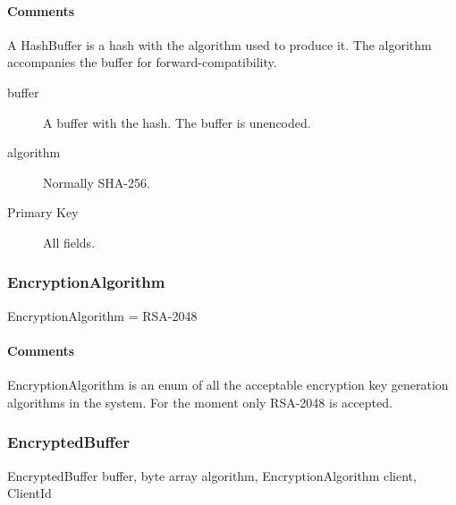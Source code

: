 \documentclass[a4paper,10pt]{article}
\begin{document}
\begin{inparaitem}[ ]
 \item \infrastructure
\end{inparaitem}

\paragraph*{Comments}
A HashBuffer is a hash with the algorithm used to produce it. The algorithm accompanies the buffer for forward-compatibility.

\SpecialItem
\begin{description}
 \item[buffer] A buffer with the hash. The buffer is unencoded.
 \item[algorithm] Normally SHA-256.
\end{description}

\SpecialItem
\begin{description}
 \item[Primary Key] All fields.
\end{description}

\subsubsection{EncryptionAlgorithm}
\begin{verbbox}
EncryptionAlgorithm = { RSA-2048 }
\end{verbbox}
\begin{center}
\theverbbox
\end{center}

\begin{inparaitem}[ ]
 \item \infrastructure
\end{inparaitem}

\paragraph*{Comments}
EncryptionAlgorithm is an enum of all the acceptable encryption key generation algorithms in the system. For the moment only RSA-2048 is accepted.

\subsubsection{EncryptedBuffer}

\begin{verbbox}
EncryptedBuffer
{
  buffer, byte array
  algorithm, EncryptionAlgorithm
  client, ClientId
}
\end{verbbox}
\begin{center}
\theverbbox
\end{center}
\end{document}
